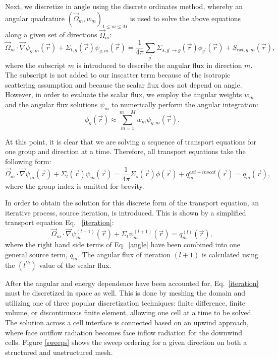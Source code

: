 \documentclass[11pt, letterpaper,titlepage,oneside]{article}
\newcommand{\vr}{\vec{r}}
\newcommand{\vo}{\vec{\Omega}}
\begin{document}
Next, we discretize in angle using the discrete ordinates method\cite{denovo}, whereby an angular quadrature $\left( \vo_m, w_m \right)_{1 \le m \le M}$ is used to solve the above equations along a given set of directions $\vo_m$:
\begin{equation}
\vo_m \cdot \vec \nabla \psi_{g,m}(\vr) +\Sigma_{t,g}(\vr) \psi_{g,m}(\vr)  = \frac{1}{4\pi}\sum_{g^{\prime}}\Sigma_{s,g^{\prime}\to g}(\vr)\phi_{g^{\prime}}(\vr) + S_{ext,g,m}(\vr),
\label{angle}
\end{equation}
where the subscript $m$ is introduced to describe the angular flux in direction $m$. The subscript is not added to our inscatter term because of the isotropic scattering assumption and because the scalar flux does not depend on angle. However, in order to evaluate the scalar flux, we employ the angular weights $w_m$ and the angular flux solutions
$\psi_m$ to numerically perform the angular integration:
\begin{equation}
\label{def_scalar_flux_2}
\phi_g(\vr) \approx \sum_{m=1}^{m=M} w_m \psi_{g,m}(\vr).
\end{equation}

At this point, it is clear that we are solving a sequence of transport equations for one group and direction at a time. Therefore, all transport equations take the following form:
\begin{equation}
\vo_m \cdot \vec \nabla \psi_{m}(\vr) +\Sigma_{t}(\vr) \psi_{m}(\vr)  = \frac{1}{4\pi}\Sigma_{s}(\vr)\phi(\vr) + q^{ext+inscat}_m(\vr) = q_m(\vr),
\end{equation}
where the group index is omitted for brevity.

In order to obtain the solution for this discrete form of the transport equation, an iterative process, source iteration, is introduced. This is shown by a simplified transport equation Eq. ~\eqref{iteration}:
\begin{equation}
\vo_m \cdot \vec\nabla \psi_m^{(l+1)}(\vr) + \Sigma_t \psi_m^{(l+1)}(\vr) = q_m^{(l)}(\vr),
\label{iteration}
\end{equation}
where the right hand side terms of Eq.~\eqref{angle} have been combined into one general source term, $q_m$. The angular flux of iteration $(l+1)$ is calculated using the $(l^{th})$ value of the scalar flux.

After the angular and energy dependence have been accounted for, Eq.~\eqref{iteration} must be discretized in space as well. This is done by meshing the domain and utilizing one of three popular discretization techniques: finite difference\cite{fd}, finite volume\cite{fd}, or discontinuous finite element\cite{Reed}, allowing one cell at a time to be solved. The solution across a cell interface is connected based on an upwind approach, where face outflow radiation becomes face inflow radiation for the downwind cells. Figure \ref{sweeps} shows the sweep ordering for a given direction on both a structured and unstructured mesh.
\end{document}
